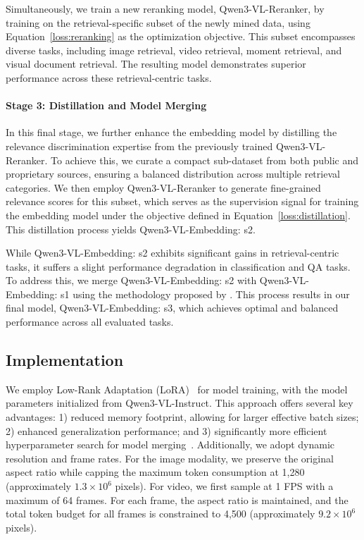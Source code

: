 \documentclass{article} %
\begin{document}
Simultaneously, we train a new reranking model, Qwen3-VL-Reranker, by training on the retrieval-specific subset of the newly mined data, using Equation~\ref{loss:reranking} as the optimization objective. This subset encompasses diverse tasks, including image retrieval, video retrieval, moment retrieval, and visual document retrieval. The resulting model demonstrates superior performance across these retrieval-centric tasks.

\paragraph{Stage 3: Distillation and Model Merging}\label{sec:stage3}
In this final stage, we further enhance the embedding model by distilling the relevance discrimination expertise from the previously trained Qwen3-VL-Reranker. To achieve this, we curate a compact sub-dataset from both public and proprietary sources, ensuring a balanced distribution across multiple retrieval categories. We then employ Qwen3-VL-Reranker to generate fine-grained relevance scores for this subset, which serves as the supervision signal for training the embedding model under the objective defined in Equation~\ref{loss:distillation}. This distillation process yields Qwen3-VL-Embedding: s2.

While Qwen3-VL-Embedding: s2 exhibits significant gains in retrieval-centric tasks, it suffers a slight performance degradation in classification and QA tasks. To address this, we merge Qwen3-VL-Embedding: s2 with Qwen3-VL-Embedding: s1 using the methodology proposed by \cite{li2024improving}. This process results in our final model, Qwen3-VL-Embedding: s3, which achieves optimal and balanced performance across all evaluated tasks.

\subsection{Implementation}

We employ Low-Rank Adaptation (LoRA)~\citep{DBLP:conf/iclr/HuSWALWWC22} for model training, with the model parameters initialized from Qwen3-VL-Instruct. This approach offers several key advantages: 1) reduced memory footprint, allowing for larger effective batch sizes; 2) enhanced generalization performance; and 3) significantly more efficient hyperparameter search for model merging~\citep{li2024improving}. 
Additionally, we adopt dynamic resolution and frame rates. For the image modality, we preserve the original aspect ratio while capping the maximum token consumption at 1,280 (approximately $1.3 \times 10^6$ pixels). For video, we first sample at 1 FPS with a maximum of 64 frames. For each frame, the aspect ratio is maintained, and the total token budget for all frames is constrained to 4,500 (approximately $9.2 \times 10^6$ pixels).
\end{document}
